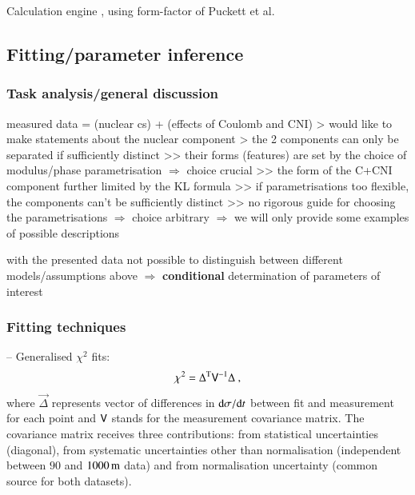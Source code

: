 Calculation engine \cite{elegent}, using form-factor of Puckett et al.~\cite{puckett10}


\subsection{Fitting/parameter inference}
\label{sec:cni fitting}

\subsubsection{Task analysis/general discussion}

\> measured data = (nuclear cs) + (effects of Coulomb and CNI)
\>> would like to make statements about the nuclear component
\>> the 2 components can only be separated if sufficiently distinct
\>>> their forms (features) are set by the choice of modulus/phase parametrisation $\Rightarrow$ choice crucial
\>>> the form of the C+CNI component further limited by the KL formula
\>>> if parametrisations too flexible, the components can't be sufficiently distinct
\>>> no rigorous guide for choosing the parametrisations $\Rightarrow$ choice arbitrary $\Rightarrow$ we will only provide some examples of possible descriptions

\> with the presented data not possible to distinguish between different models/assumptions above $\Rightarrow$ {\bf conditional} determination of parameters of interest

\subsubsection{Fitting techniques}

\>  -- Generalised $\chi^2$ fits:
\begin{equation}
\label{eq:chi sq}
	\chi^2 = \Delta^{\rm T} \mathsf{V}^{-1} \Delta\ ,
\end{equation}
where $\vec\Delta$ represents vector of differences in ${\rm d}\sigma/{\rm d} t$ between fit and measurement for each point and $\mathsf{V}$ stands for the measurement covariance matrix. The covariance matrix receives three contributions: from statistical uncertainties (diagonal), from systematic uncertainties other than normalisation (independent between $90$ and $1000\,{\rm m}$ data) and from normalisation uncertainty (common source for both datasets).

